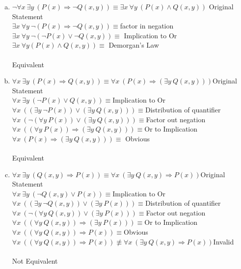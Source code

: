 \documentclass[11pt,letterpaper]{article}
\begin{document}
\begin{enumerate}[(a)]
\item
$\neg\forall x~\exists y~(P(x)\Rightarrow\neg Q(x,y)) \equiv \exists x~\forall y~(P(x)\wedge Q(x,y))$ \hfill Original Statement\\
$\exists x~\forall y~\neg(P(x)\Rightarrow\neg Q(x,y)) \equiv$\hfill factor in negation\\
$\exists x~\forall y~\neg(\neg P(x)\vee\neg Q(x,y)) \equiv$ \hfill Implication to Or\\
$\exists x~\forall y(P(x)\wedge Q(x,y)) \equiv$ \hfill Demorgan's Law\\ 
\\
Equivalent
\item
$\forall x~\exists y~(P(x)\Rightarrow Q(x,y)) \equiv \forall x~(P(x)\Rightarrow (\exists y~ Q(x,y)))$\hfill Original Statement\\
$\forall x~\exists y~(\neg P(x)\vee Q(x,y)) \equiv$\hfill Implication to Or\\
$\forall x~((\exists y~\neg P(x))\vee (\exists y~Q(x,y))) \equiv$\hfill Distribution of quantifier\\
$\forall x~(\neg(\forall y~ P(x))\vee (\exists y~Q(x,y))) \equiv$\hfill Factor out negation\\
$\forall x~((\forall y~ P(x))\Rightarrow (\exists y~Q(x,y))) \equiv$\hfill Or to Implication\\
$\forall x~(P(x)\Rightarrow (\exists y~Q(x,y))) \equiv$ \hfill Obvious\\
\\
Equivalent
\item
$\forall x~\exists y~(Q(x,y)\Rightarrow P(x)) \equiv \forall x~(\exists y~ Q(x,y)\Rightarrow P(x))$\hfill Original Statement\\
$\forall x~\exists y~(\neg Q(x,y)\vee P(x)) \equiv$\hfill Implication to Or\\
$\forall x~((\exists y~\neg Q(x,y))\vee (\exists y~ P(x))) \equiv$\hfill Distribution of quantifier\\
$\forall x~(\neg(\forall y~ Q(x,y))\vee (\exists y~ P(x))) \equiv$\hfill Factor out negation\\
$\forall x~((\forall y~ Q(x,y))\Rightarrow (\exists y~ P(x))) \equiv$\hfill Or to Implication\\
$\forall x~((\forall y~ Q(x,y))\Rightarrow P(x)) \equiv$\hfill Obvious\\
$\forall x~((\forall y~ Q(x,y))\Rightarrow P(x)) \not\equiv \forall x~(\exists y~ Q(x,y)\Rightarrow P(x))$\hfill Invalid\\
\\
Not Equivalent
\end{enumerate}
\end{document}
